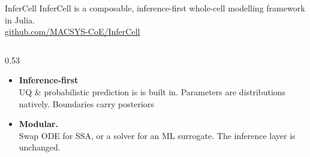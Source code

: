 \documentclass[aspectratio=169]{beamer}
\begin{document}
\begin{frame}{InferCell}
	\vspace{-1mm}
	InferCell is a composable, inference-first whole-cell modelling framework in
	Julia.\\
	{\scriptsize\href{https://github.com/MACSYS-CoE/InferCell}{github.com/MACSYS-CoE/InferCell}}

	\vspace{0.5mm}
	\begin{columns}[c,onlytextwidth]
		\begin{column}{0.53\textwidth}
			\small
			\begin{itemize}\itemsep3pt
				\item \textbf{Inference-first}\\
				{\scriptsize UQ  \& probabilistic prediction is is built in. Parameters are distributions natively. Boundaries carry posteriors}

				\item \textbf{Modular.}\\
				{\scriptsize Swap ODE for SSA, or a solver for an ML surrogate.
				The inference layer is unchanged.}


\end{itemize}
\end{column}
\end{columns}
\end{frame}
\end{document}

